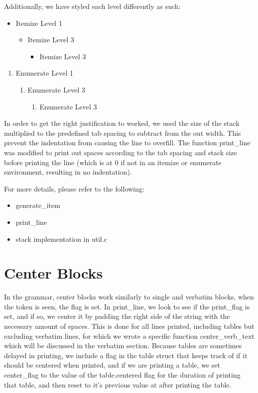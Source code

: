 Additionally, we have styled each level differently as such:

\begin{itemize}
\item Itemize Level 1
\begin{itemize}
\item Itemize Level 3
\begin{itemize}
\item Itemize Level 3
\end{itemize}
\end{itemize}
\end{itemize}
\begin{enumerate}
\item Enumerate Level 1
\begin{enumerate}
\item Enumerate Level 3
\begin{enumerate}
\item Enumerate Level 3
\end{enumerate}
\end{enumerate}
\end{enumerate}

In order to get the right justification to worked, we used the size of the stack multiplied
to the predefined tab spacing to subtract from the out width. This prevent the indentation
from causing the line to overfill. The function print_line was modified to print out spaces
according to the tab spacing and stack size before printing the line (which is at 0 if not
in an itemize or enumerate environment, resulting in no indentation).

For more details, please refer to the following:
\begin{itemize}
\item generate_item
\item print_line
\item stack implementation in util.c
\end{itemize}

\section{Center Blocks}
In the grammar, center blocks work similarly to single and verbatim blocks, when the token is seen, the flag is set. In print_line, we look to see if the print_flag is set, and if so, we center it by padding the right side of the string with the necessary amount of spaces. This is done for all lines printed, including tables but excluding verbatim lines, for which we wrote a specific function center_verb_text which will be discussed in the verbatim section. Because tables are sometimes delayed in printing, we include a flag in the table struct that keeps track of if it should be centered when printed, and if we are printing a table, we set center_flag to the value of the table.centered flag for the duration of printing that table, and then reset to it's previous value at after printing the table.

